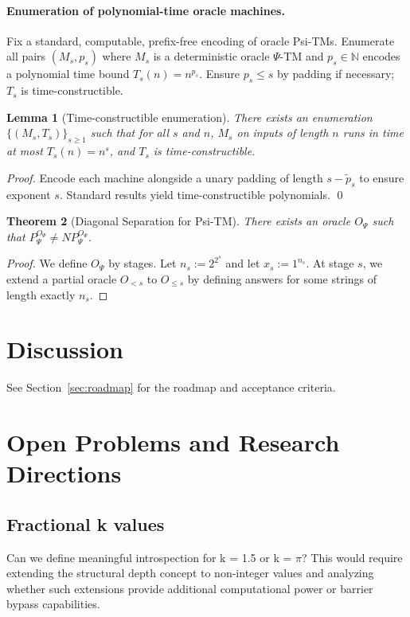 \documentclass[11pt]{article}
\newtheorem{theorem}{Theorem}[section]
\newtheorem{lemma}[theorem]{Lemma}
\theoremstyle{plain}
\theoremstyle{definition}
\newcommand{\PSi}{\ensuremath{\Psi}}
\begin{document}
\paragraph{Enumeration of polynomial-time oracle machines.}
Fix a standard, computable, prefix-free encoding of oracle Psi-TMs. Enumerate all pairs $(M_s, p_s)$ where $M_s$ is a deterministic oracle $\PSi$-TM and $p_s\in\mathbb{N}$ encodes a polynomial time bound $T_s(n)=n^{p_s}$. Ensure $p_s\le s$ by padding if necessary; $T_s$ is time-constructible.

\begin{lemma}[Time-constructible enumeration]
\label{lem:enum}
There exists an enumeration $\{(M_s,T_s)\}_{s\ge1}$ such that for all $s$ and $n$, $M_s$ on inputs of length $n$ runs in time at most $T_s(n)=n^{s}$, and $T_s$ is time-constructible.
\end{lemma}
\begin{proof}
Encode each machine alongside a unary padding of length $s-\tilde p_s$ to ensure exponent $s$. Standard results yield time-constructible polynomials. \qed
\end{proof}

\begin{theorem}[Diagonal Separation for Psi-TM]
\label{thm:diagonal}
There exists an oracle $O_\PSi$ such that $P^{O_\PSi}_\PSi \neq NP^{O_\PSi}_\PSi$.
\end{theorem}

\begin{proof}
We define $O_\PSi$ by stages. Let $n_s:=2^{2^{s}}$ and let $x_s:=1^{n_s}$. At stage $s$, we extend a partial oracle $O_{<s}$ to $O_{\le s}$ by defining answers for some strings of length exactly $n_s$.
\end{proof}

\fi

\section{Discussion}\label{sec:discussion}

See Section~\ref{sec:roadmap} for the roadmap and acceptance criteria.

\section{Open Problems and Research Directions}

\subsection{Fractional k values}
Can we define meaningful introspection for k = 1.5 or k = $\pi$? This would require extending the structural depth concept to non-integer values and analyzing whether such extensions provide additional computational power or barrier bypass capabilities.
\end{document}
